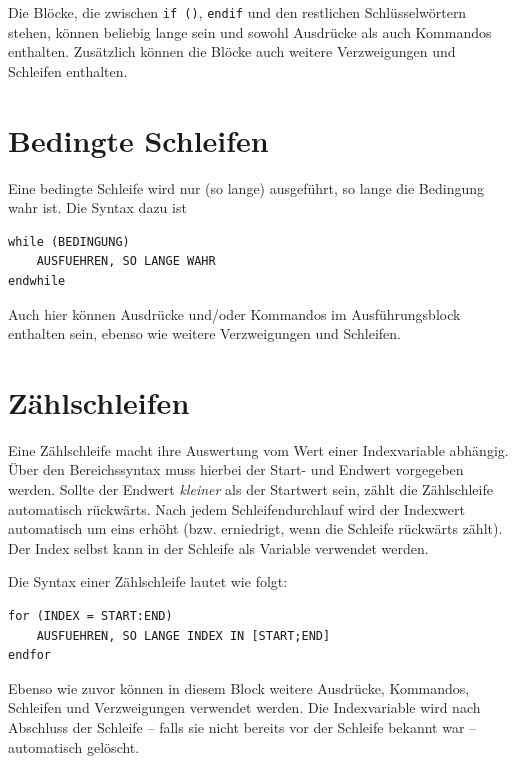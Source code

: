 \documentclass[DIV=14,headsepline,footsepline]{scrbook}
\begin{document}
				Die Blöcke, die zwischen \verb+if ()+, \verb+endif+ und den restlichen Schlüsselwörtern stehen, können beliebig lange sein und sowohl Ausdrücke als auch Kommandos enthalten. Zusätzlich können die Blöcke auch weitere Verzweigungen und Schleifen enthalten.
				
			\section{Bedingte Schleifen}
				Eine bedingte Schleife wird nur (so lange) ausgeführt, so lange die Bedingung wahr ist. Die Syntax dazu ist
				\begin{lstlisting}
while (BEDINGUNG)
	AUSFUEHREN, SO LANGE WAHR
endwhile
				\end{lstlisting}
				Auch hier können Ausdrücke und/oder Kommandos im Ausführungsblock enthalten sein, ebenso wie weitere Verzweigungen und Schleifen.
				
			\section{Zählschleifen}
				Eine Zählschleife macht ihre Auswertung vom Wert einer Indexvariable abhängig. Über den Bereichssyntax muss hierbei der Start- und Endwert vorgegeben werden. Sollte der Endwert \emph{kleiner} als der Startwert sein, zählt die Zählschleife automatisch rückwärts. Nach jedem Schleifendurchlauf wird der Indexwert automatisch um eins erhöht (bzw. erniedrigt, wenn die Schleife rückwärts zählt). Der Index selbst kann in der Schleife als Variable verwendet werden.
				
				Die Syntax einer Zählschleife lautet wie folgt:
				\begin{lstlisting}
for (INDEX = START:END)
	AUSFUEHREN, SO LANGE INDEX IN [START;END]
endfor
				\end{lstlisting}
				Ebenso wie zuvor können in diesem Block weitere Ausdrücke, Kommandos, Schleifen und Verzweigungen verwendet werden. Die Indexvariable wird nach Abschluss der Schleife -- falls sie nicht bereits vor der Schleife bekannt war -- automatisch gelöscht.
				
\end{document}
